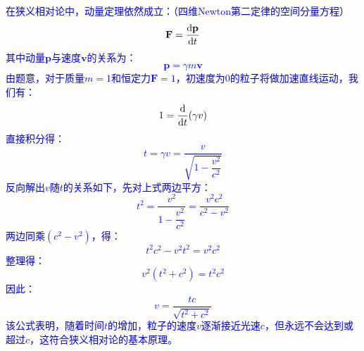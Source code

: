 \documentclass[a4paper]{article}
\begin{document}
\begin{enumerate}
    \textcolor{blue}{
        在狭义相对论中，动量定理依然成立：（四维Newton第二定律的空间分量方程）
        \[
            \mathbf{F} = \dv{\mathbf{p}}{t}
        \]
        其中动量$\mathbf{p}$与速度$\mathbf{v}$的关系为：
        \[
            \mathbf{p} = \gamma m \mathbf{v}
        \]
        由题意，对于质量$m = 1$和恒定力$\mathbf{F} = 1$，初速度为0的粒子将做加速直线运动，我们有：
        \[
            1 = \dv{t}(\gamma v)
        \]
        直接积分得：
        \[
            t = \gamma v = \frac{v}{\sqrt{1 - \dfrac{v^2}{c^2}}}
        \]
        反向解出$v$随$t$的关系如下，先对上式两边平方：
        \[
            t^2 = \frac{v^2}{1 - \dfrac{v^2}{c^2}} = \frac{v^2 c^2}{c^2 - v^2}
        \]
        两边同乘$(c^2 - v^2)$，得：
        \[
            t^2 c^2 - v^2 t^2 = v^2 c^2
        \]
        整理得：
        \[
            v^2 (t^2 + c^2) = t^2 c^2
        \]
        因此：
        \[
            v = \frac{tc}{\sqrt{t^2 + c^2}}
        \]
        该公式表明，随着时间$t$的增加，粒子的速度$v$逐渐接近光速$c$，但永远不会达到或超过$c$，这符合狭义相对论的基本原理。
    }

\end{enumerate}
\end{document}
